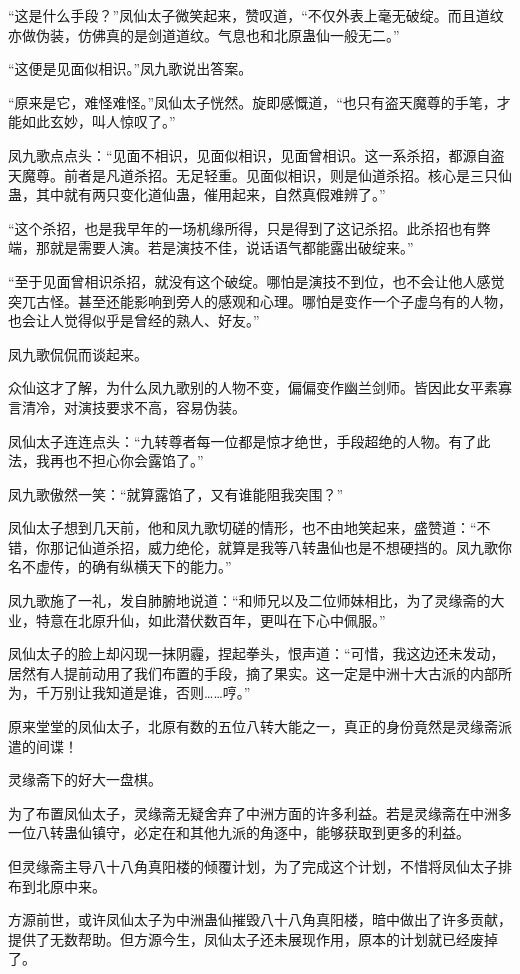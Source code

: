 \begin{this_body}
“这是什么手段？”凤仙太子微笑起来，赞叹道，“不仅外表上毫无破绽。而且道纹亦做伪装，仿佛真的是剑道道纹。气息也和北原蛊仙一般无二。”

“这便是见面似相识。”凤九歌说出答案。

“原来是它，难怪难怪。”凤仙太子恍然。旋即感慨道，“也只有盗天魔尊的手笔，才能如此玄妙，叫人惊叹了。”

凤九歌点点头：“见面不相识，见面似相识，见面曾相识。这一系杀招，都源自盗天魔尊。前者是凡道杀招。无足轻重。见面似相识，则是仙道杀招。核心是三只仙蛊，其中就有两只变化道仙蛊，催用起来，自然真假难辨了。”

“这个杀招，也是我早年的一场机缘所得，只是得到了这记杀招。此杀招也有弊端，那就是需要人演。若是演技不佳，说话语气都能露出破绽来。”

“至于见面曾相识杀招，就没有这个破绽。哪怕是演技不到位，也不会让他人感觉突兀古怪。甚至还能影响到旁人的感观和心理。哪怕是变作一个子虚乌有的人物，也会让人觉得似乎是曾经的熟人、好友。”

凤九歌侃侃而谈起来。

众仙这才了解，为什么凤九歌别的人物不变，偏偏变作幽兰剑师。皆因此女平素寡言清冷，对演技要求不高，容易伪装。

凤仙太子连连点头：“九转尊者每一位都是惊才绝世，手段超绝的人物。有了此法，我再也不担心你会露馅了。”

凤九歌傲然一笑：“就算露馅了，又有谁能阻我突围？”

凤仙太子想到几天前，他和凤九歌切磋的情形，也不由地笑起来，盛赞道：“不错，你那记仙道杀招，威力绝伦，就算是我等八转蛊仙也是不想硬挡的。凤九歌你名不虚传，的确有纵横天下的能力。”

凤九歌施了一礼，发自肺腑地说道：“和师兄以及二位师妹相比，为了灵缘斋的大业，特意在北原升仙，如此潜伏数百年，更叫在下心中佩服。”

凤仙太子的脸上却闪现一抹阴霾，捏起拳头，恨声道：“可惜，我这边还未发动，居然有人提前动用了我们布置的手段，摘了果实。这一定是中洲十大古派的内部所为，千万别让我知道是谁，否则……哼。”

原来堂堂的凤仙太子，北原有数的五位八转大能之一，真正的身份竟然是灵缘斋派遣的间谍！

灵缘斋下的好大一盘棋。

为了布置凤仙太子，灵缘斋无疑舍弃了中洲方面的许多利益。若是灵缘斋在中洲多一位八转蛊仙镇守，必定在和其他九派的角逐中，能够获取到更多的利益。

但灵缘斋主导八十八角真阳楼的倾覆计划，为了完成这个计划，不惜将凤仙太子排布到北原中来。

方源前世，或许凤仙太子为中洲蛊仙摧毁八十八角真阳楼，暗中做出了许多贡献，提供了无数帮助。但方源今生，凤仙太子还未展现作用，原本的计划就已经废掉了。


\end{this_body}
